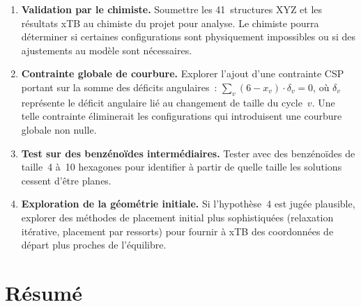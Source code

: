 \documentclass[12pt,a4paper]{article}
\theoremstyle{definition}
\theoremstyle{remark}
\begin{document}
\begin{enumerate}
  \item \textbf{Validation par le chimiste.} Soumettre les 41~structures
        XYZ et les r\'esultats xTB au chimiste du projet pour analyse.
        Le chimiste pourra d\'eterminer si certaines configurations sont
        physiquement impossibles ou si des ajustements au mod\`ele
        sont n\'ecessaires.

  \item \textbf{Contrainte globale de courbure.} Explorer l'ajout d'une
        contrainte CSP portant sur la somme des d\'eficits angulaires~:
        $\sum_v (6 - x_v) \cdot \delta_v = 0$, o\`u $\delta_v$
        repr\'esente le d\'eficit angulaire li\'e au changement de taille
        du cycle~$v$. Une telle contrainte \'eliminerait les
        configurations qui introduisent une courbure globale non nulle.

  \item \textbf{Test sur des benz\'eno\"ides interm\'ediaires.}
        Tester avec des benz\'eno\"ides de taille~4 \`a~10 hexagones pour
        identifier \`a partir de quelle taille les solutions cessent
        d'\^etre planes.

  \item \textbf{Exploration de la g\'eom\'etrie initiale.} Si
        l'hypoth\`ese~4 est jug\'ee plausible, explorer des m\'ethodes
        de placement initial plus sophistiqu\'ees (relaxation
        it\'erative, placement par ressorts) pour fournir \`a xTB des
        coordonn\'ees de d\'epart plus proches de l'\'equilibre.
\end{enumerate}


\section*{R\'esum\'e}
\end{document}
